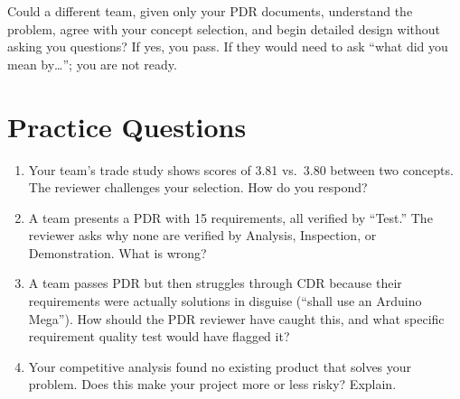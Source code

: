 \documentclass[11pt,letterpaper,twoside,openany]{book}
\begin{document}
\begin{tipbox}
Could a different team, given only your PDR documents, understand the problem, agree with your concept selection, and begin detailed design without asking you questions? If yes, you pass. If they would need to ask ``what did you mean by\ldots''; you are not ready.
\end{tipbox}

\section{Practice Questions}
\begin{enumerate}[leftmargin=1.5em]
\item Your team's trade study shows scores of 3.81 vs.\ 3.80 between two concepts. The reviewer challenges your selection. How do you respond?
\item A team presents a PDR with 15 requirements, all verified by ``Test.'' The reviewer asks why none are verified by Analysis, Inspection, or Demonstration. What is wrong?

\item A team passes PDR but then struggles through CDR because their requirements were actually solutions in disguise (``shall use an Arduino Mega''). How should the PDR reviewer have caught this, and what specific requirement quality test would have flagged it?
\item Your competitive analysis found no existing product that solves your problem. Does this make your project more or less risky? Explain.
\end{enumerate}
\end{document}
